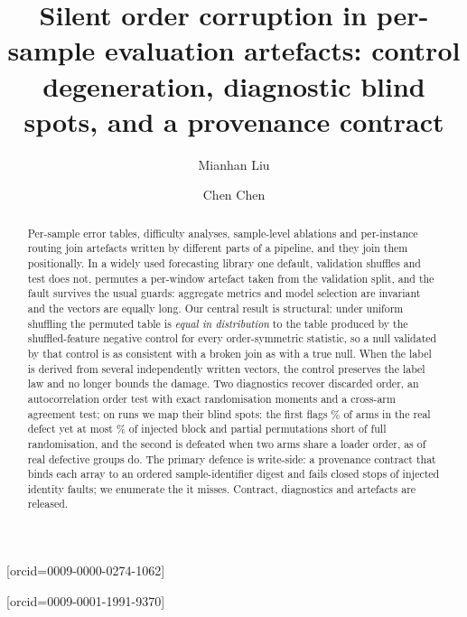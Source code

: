 \documentclass[a4paper,fleqn]{cas-sc}
\makeatletter
\gdef\correspemail{1367489893@qq.com}
\gdef\secondemail{1577027526@qq.com}
\makeatother
\begin{document}
\let\WriteBookmarks\relax
\def\floatpagepagefraction{1}
\def\textpagefraction{.001}


\title[mode = title]{Silent order corruption in per-sample evaluation artefacts:
control degeneration, diagnostic blind spots, and a provenance contract}

\author[1]{Mianhan Liu}[orcid=0009-0000-0274-1062]
\cormark[1]
\expandafter\ead\expandafter{\correspemail}

\author[1]{Chen Chen}[orcid=0009-0001-1991-9370]
\expandafter\ead\expandafter{\secondemail}



\begin{abstract}
Per-sample error tables, difficulty analyses, sample-level ablations and
per-instance routing join artefacts written by different parts of a pipeline, and
they join them positionally. In a widely used forecasting library one default,
validation shuffles and test does not, permutes a per-window artefact taken from
the validation split, and the fault survives the usual guards: aggregate metrics
and model selection are invariant and the vectors are equally long. Our central
result is structural: under uniform shuffling the permuted table is \emph{equal in
distribution} to the table produced by the shuffled-feature negative control for
every order-symmetric statistic, so a null validated by that control is as
consistent with a broken join as with a true null. When the label is derived from
several independently written vectors, the control preserves the label law and no
longer bounds the damage. Two diagnostics recover discarded order, an
autocorrelation order test with exact randomisation moments and a cross-arm
agreement test; on \NumRuns{} runs we map their blind spots: the first flags
\NumObsAotFlagPct\% of arms in the real defect yet at most
\NumSensFlagPartialQuarter\% of injected block and partial permutations short of
full randomisation, and the second is defeated when two arms share a loader order,
as \NumObsPermPartialShared{} of \NumObsPermGroups{} real defective groups do. The
primary defence is write-side: a provenance contract that binds each array to an
ordered sample-identifier digest and fails closed stops \NumContractDetected{} of
\NumContractFaults{} injected identity faults; we enumerate the
\NumContractUndetected{} it misses. Contract, diagnostics and artefacts are
released.
\end{abstract}
\end{document}
